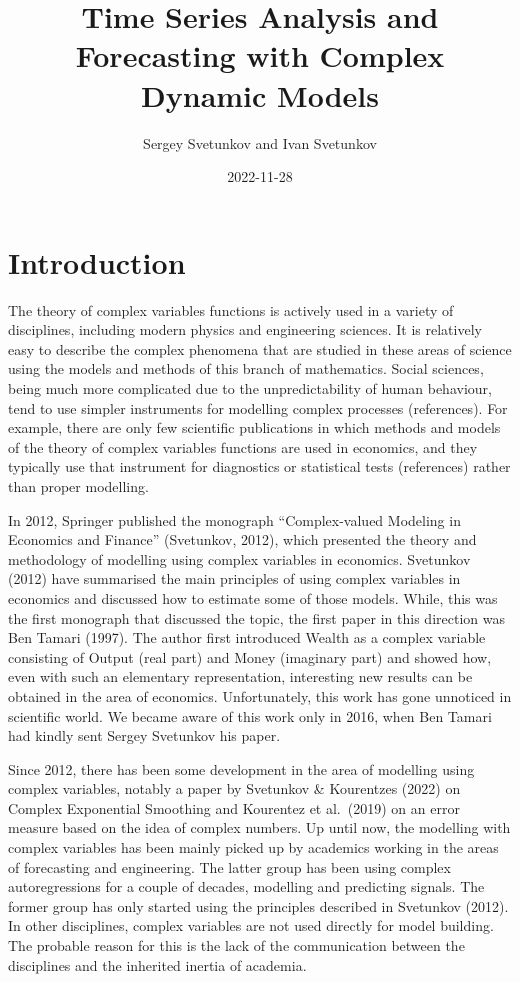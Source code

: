 \documentclass[
]{book}
\title{Time Series Analysis and Forecasting with Complex Dynamic Models}
\author{Sergey Svetunkov and Ivan Svetunkov}
\date{2022-11-28}
\begin{document}
\maketitle

{
\setcounter{tocdepth}{1}
\tableofcontents
}
\hypertarget{introduction}{%
\chapter*{Introduction}\label{introduction}}

The theory of complex variables functions is actively used in a variety of disciplines, including modern physics and engineering sciences. It is relatively easy to describe the complex phenomena that are studied in these areas of science using the models and methods of this branch of mathematics. Social sciences, being much more complicated due to the unpredictability of human behaviour, tend to use simpler instruments for modelling complex processes (references). For example, there are only few scientific publications in which methods and models of the theory of complex variables functions are used in economics, and they typically use that instrument for diagnostics or statistical tests (references) rather than proper modelling.

In 2012, Springer published the monograph ``Complex-valued Modeling in Economics and Finance'' (Svetunkov, 2012), which presented the theory and methodology of modelling using complex variables in economics. Svetunkov (2012) have summarised the main principles of using complex variables in economics and discussed how to estimate some of those models. While, this was the first monograph that discussed the topic, the first paper in this direction was Ben Tamari (1997). The author first introduced Wealth as a complex variable consisting of Output (real part) and Money (imaginary part) and showed how, even with such an elementary representation, interesting new results can be obtained in the area of economics. Unfortunately, this work has gone unnoticed in scientific world. We became aware of this work only in 2016, when Ben Tamari had kindly sent Sergey Svetunkov his paper.

Since 2012, there has been some development in the area of modelling using complex variables, notably a paper by Svetunkov \& Kourentzes (2022) on Complex Exponential Smoothing and Kourentez et al.~(2019) on an error measure based on the idea of complex numbers. Up until now, the modelling with complex variables has been mainly picked up by academics working in the areas of forecasting and engineering. The latter group has been using complex autoregressions for a couple of decades, modelling and predicting signals. The former group has only started using the principles described in Svetunkov (2012). In other disciplines, complex variables are not used directly for model building. The probable reason for this is the lack of the communication between the disciplines and the inherited inertia of academia.
\end{document}
